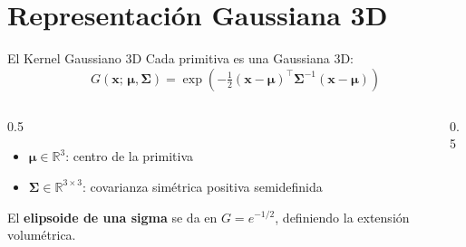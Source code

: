 \section{Representación Gaussiana 3D}

\begin{frame}{El Kernel Gaussiano 3D}
  Cada primitiva es una Gaussiana 3D:
  \[
    G(\mathbf{x};\, \boldsymbol{\mu}, \boldsymbol{\Sigma}) = \exp\!\left(-\tfrac{1}{2}(\mathbf{x}-\boldsymbol{\mu})^\top \boldsymbol{\Sigma}^{-1}(\mathbf{x}-\boldsymbol{\mu})\right)
  \]
  \begin{columns}
    \begin{column}{0.5\textwidth}
      \begin{itemize}
        \item $\boldsymbol{\mu} \in \mathbb{R}^3$: centro de la primitiva
        \item $\boldsymbol{\Sigma} \in \mathbb{R}^{3\times3}$: covarianza simétrica positiva semidefinida
      \end{itemize}
      \vspace{0.5em}
      El \textbf{elipsoide de una sigma} se da en $G = e^{-1/2}$, definiendo la extensión volumétrica.
    \end{column}
    \begin{column}{0.5\textwidth}
    \end{column}
  \end{columns}
\end{frame}

